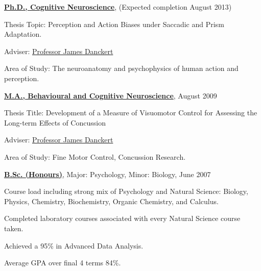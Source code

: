 \documentclass[10pt]{article}
\newenvironment{outerlist}[1][\enskip\textbullet]%
        {\begin{enumerate}[#1]}{\end{enumerate}%
         \vspace{-.6\baselineskip}}
\newenvironment{innerlist}[1][\enskip\textbullet]%
        {\begin{compactenum}[#1]}{\end{compactenum}}
\begin{document}
\begin{outerlist}

\item[] \href{http://psychology.uwaterloo.ca}
             {\textbf{Ph.D., Cognitive Neuroscience}}, (Expected completion August 2013)
        
        \begin{innerlist}
        \item Thesis Topic: Perception and Action Biases under Saccadic and Prism Adaptation.
        \item Adviser:
              \href{http://psychology.uwaterloo.ca/people/faculty/jdancker/index.html}
                   {Professor James Danckert}
        \item Area of Study: The neuroanatomy and psychophysics of human action and perception.
        \end{innerlist}

\item[] \href{http://psychology.uwaterloo.ca}
             {\textbf{M.A., Behavioural and Cognitive Neuroscience}}, August 2009
        
        \begin{innerlist}
        \item Thesis Title: Development of a Measure of Visuomotor Control for Assessing the Long-term Effects of Concussion
        \item Adviser:
              \href{http://psychology.uwaterloo.ca/people/faculty/jdancker/index.html}
                   {Professor James Danckert}
        \item Area of Study: Fine Motor Control, Concussion Research.
        \end{innerlist}

\item[] \href{http://science.uwaterloo.ca}
        {\textbf{B.Sc. (Honours)}},
             Major: Psychology, Minor: Biology, June 2007
        \begin{innerlist}
        \item Course load including strong mix of Psychology and Natural Science: Biology, Physics, Chemistry, Biochemistry, Organic Chemistry, and Calculus.
        \item Completed laboratory courses associated with every Natural Science course taken.
        \item Achieved a 95\% in Advanced Data Analysis.
        \item Average GPA over final 4 terms 84\%.
        \end{innerlist}

\end{outerlist}
\end{document}
